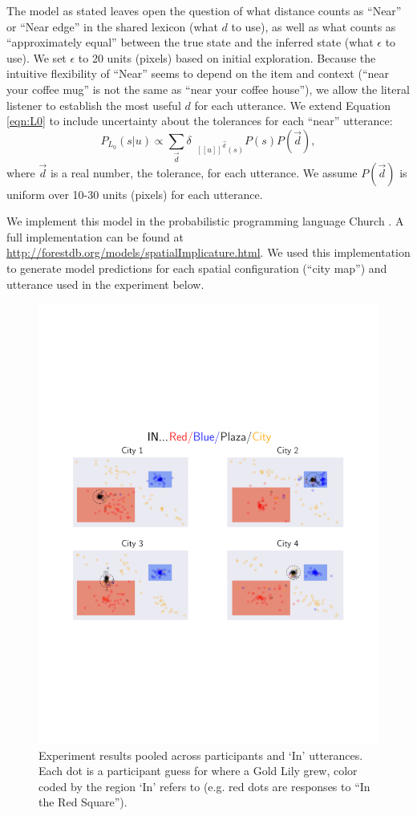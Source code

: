 \documentclass[10pt,letterpaper]{article}
\newcommand{\denote}[1]{\mbox{ $[\![ #1 ]\!]$}}
\begin{document}
The model as stated leaves open the question of what distance counts as ``Near'' or ``Near edge'' in the shared lexicon (what $d$ to use), as well as what counts as ``approximately equal'' between the true state and the inferred state (what $\epsilon$ to use). We set $\epsilon$ to 20 units (pixels) based on initial exploration. Because the intuitive flexibility of ``Near'' seems to depend on the item and context (``near your coffee mug'' is not the same as ``near your coffee house''), we allow the literal listener to establish the most useful $d$ for each utterance.
We extend Equation \ref{eqn:L0} to include uncertainty about the tolerances for each ``near'' utterance:
\begin{equation}
P_{L_0}(s|u)\propto \sum_{\vec{d}} \delta_{\denote{u}^{\vec{d}}(s)} P(s) P(\vec{d})\label{eqn:L0tol},
\end{equation}
where $\vec{d}$ is a real number, the tolerance, for each utterance. We assume $P(\vec{d})$ is uniform over 10-30 units (pixels) for each utterance. 

We implement this model in the probabilistic programming language Church \cite{goodman2012church}. A full implementation can be found at \url{http://forestdb.org/models/spatialImplicature.html}. We used this implementation to generate model predictions for each spatial configuration (``city map'') and utterance used in the experiment below.

\begin{figure}[!t]
\center
\includegraphics[width=.79\textwidth]{figures/In.pdf}
\caption{Experiment results pooled across participants and `In' utterances. Each dot is a participant guess for where a Gold Lily grew, color coded by the region `In' refers to (e.g. red dots are responses to ``In the Red Square'').}
\label{fig:In}
\end{figure}
\end{document}
